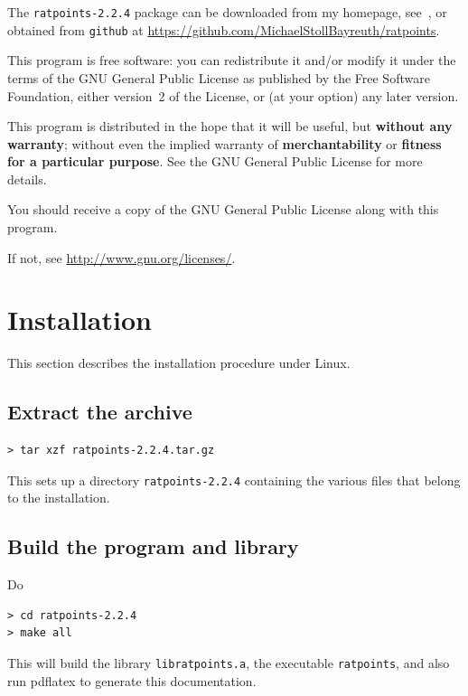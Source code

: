 \documentclass[12pt,a4paper,oneside]{amsart}
\newcommand{\rpversion}{2.2.4} %
\begin{document}
The \texttt{ratpoints-\rpversion} package can be downloaded from my homepage,
see~\cite{ratpoints}, or obtained from \texttt{github} at
\url{https://github.com/MichaelStollBayreuth/ratpoints}.

This program is free software: you can redistribute it and/or modify
it under the terms of the GNU General Public License as published
by the Free Software Foundation, either version~2 of the License, or
(at your option) any later version.

This program is distributed in the hope that it will be useful,
but \textbf{without any warranty}; without even the implied warranty of
\textbf{merchantability} or \textbf{fitness for a particular purpose}. See the
GNU General Public License for more details.

You should receive a copy of the GNU General Public License
along with this program.

If not, see \url{http://www.gnu.org/licenses/}.


\section{Installation}

This section describes the installation procedure under Linux.

\subsection{Extract the archive}

\begin{verbatim}
> tar xzf ratpoints-2.2.4.tar.gz
\end{verbatim}

This sets up a directory \texttt{ratpoints-\rpversion} containing the various
files that belong to the installation.

\subsection{Build the program and library}

Do

\begin{verbatim}
> cd ratpoints-2.2.4
> make all
\end{verbatim}

This will build the library \texttt{libratpoints.a}, the executable
\texttt{ratpoints}, and also run pdf\/latex to generate this documentation.
\end{document}
